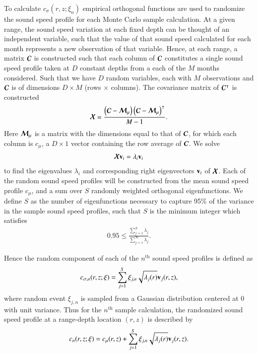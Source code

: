 To calculate $c_\sigma(r,z;\xi_n)$ empirical orthogonal functions are
used to randomize the sound speed profile for each Monte Carlo sample
calculation. At a given range, the sound speed variation at each fixed depth can
be thought of an independent variable, such that the value of that
sound speed calculated for each month represents a new observation of
that variable. Hence, at each range, a matrix $\boldsymbol{\mathcal{C}}$ is
constructed such that each column of $\boldsymbol{\mathcal{C}}$ constitutes a single
sound speed profile taken at $D$ constant depths from a each of the
$M$ months considered. Such that we have $D$ random variables, each
with $M$ observations and $\boldsymbol{\mathcal{C}}$ is of dimensions $D \times M$
(rows $\times$ columns). The covariance matrix of $\boldsymbol{\mathcal{C}}^\intercal$ is
constructed
\begin{align*}
  \boldsymbol{\mathcal{X}} = \frac{\left(\boldsymbol{\mathcal{C}}-\boldsymbol{\mathcal{M}}_\mu\right) \left(\boldsymbol{\mathcal{C}}-\boldsymbol{\mathcal{M}}_\mu\right)^\intercal}{M-1}.
\end{align*}
Here $\boldsymbol{\mathcal{M}}_\mu$ is a matrix with the dimensions equal to that of
$\boldsymbol{\mathcal{C}}$, for which each column is $c_\mu$, a $D \times 1$ vector
containing the row average of $\boldsymbol{\mathcal{C}}$. We solve
\begin{align*}
  \boldsymbol{\mathcal{X}}\boldsymbol{\mathbf{v}}_i = \lambda_i\boldsymbol{\mathbf{v}}_i
\end{align*}
to find the eigenvalues $\lambda_i$ and corresponding right
eigenvectors $\boldsymbol{\mathbf{v}}_i$ of $\boldsymbol{\mathcal{X}}$. Each of the random sound
speed profiles will be constructed from the mean sound speed profile
$c_\mu$, and a sum over $S$ randomly weighted orthogonal
eigenfunctions. We define $S$ as the number of eigenfunctions
necessary to capture 95\% of the variance in the sample sound speed
profiles, such that $S$ is the minimum integer which satisfies
\begin{align*}
  0.95\leq\frac{\sum_{j=1}^S \lambda_j}{\sum_{j=1}^\infty \lambda_j}.
\end{align*}

Hence the random component of each of the $n^{\text{th}}$ sound speed
profiles is defined as
\begin{align*}
  c_{\sigma,n}(r,z;\xi) = \sum_{j=1}^S \xi_{j,n} \sqrt{\lambda_j(r)}\boldsymbol{\mathbf{v}}_j(r,z),
\end{align*}
where random event $\xi_{j,n}$ is sampled from a Gaussian distribution
centered at $0$ with unit variance. Thus for the $n^{\text{th}}$ sample calculation, the 
randomized sound speed profile at a range-depth location $(r,z)$ is described by
\begin{align*}
  c_n(r,z;\xi) = c_\mu(r,z) + \sum_{j=1}^S \xi_{j,n} \sqrt{\lambda_j(r)}\boldsymbol{\mathbf{v}}_j(r,z).
\end{align*}




